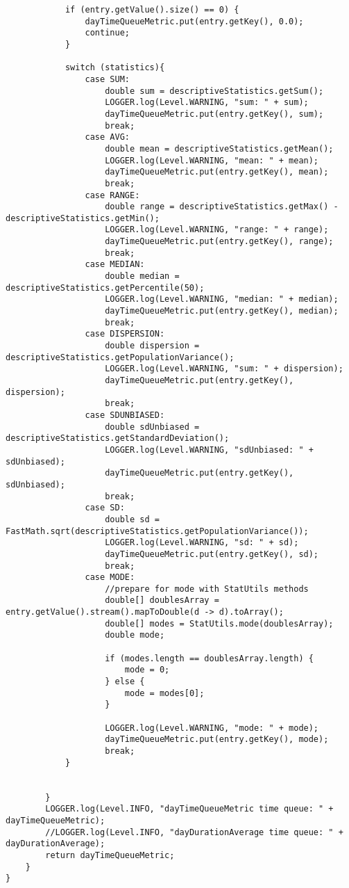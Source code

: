 \begin{lstlisting}
            if (entry.getValue().size() == 0) {
                dayTimeQueueMetric.put(entry.getKey(), 0.0);
                continue;
            }

            switch (statistics){
                case SUM:
                    double sum = descriptiveStatistics.getSum();
                    LOGGER.log(Level.WARNING, "sum: " + sum);
                    dayTimeQueueMetric.put(entry.getKey(), sum);
                    break;
                case AVG:
                    double mean = descriptiveStatistics.getMean();
                    LOGGER.log(Level.WARNING, "mean: " + mean);
                    dayTimeQueueMetric.put(entry.getKey(), mean);
                    break;
                case RANGE:
                    double range = descriptiveStatistics.getMax() - descriptiveStatistics.getMin();
                    LOGGER.log(Level.WARNING, "range: " + range);
                    dayTimeQueueMetric.put(entry.getKey(), range);
                    break;
                case MEDIAN:
                    double median = descriptiveStatistics.getPercentile(50);
                    LOGGER.log(Level.WARNING, "median: " + median);
                    dayTimeQueueMetric.put(entry.getKey(), median);
                    break;
                case DISPERSION:
                    double dispersion = descriptiveStatistics.getPopulationVariance();
                    LOGGER.log(Level.WARNING, "sum: " + dispersion);
                    dayTimeQueueMetric.put(entry.getKey(), dispersion);
                    break;
                case SDUNBIASED:
                    double sdUnbiased = descriptiveStatistics.getStandardDeviation();
                    LOGGER.log(Level.WARNING, "sdUnbiased: " + sdUnbiased);
                    dayTimeQueueMetric.put(entry.getKey(), sdUnbiased);
                    break;
                case SD:
                    double sd = FastMath.sqrt(descriptiveStatistics.getPopulationVariance());
                    LOGGER.log(Level.WARNING, "sd: " + sd);
                    dayTimeQueueMetric.put(entry.getKey(), sd);
                    break;
                case MODE:
                    //prepare for mode with StatUtils methods
                    double[] doublesArray = entry.getValue().stream().mapToDouble(d -> d).toArray();
                    double[] modes = StatUtils.mode(doublesArray);
                    double mode;

                    if (modes.length == doublesArray.length) {
                        mode = 0;
                    } else {
                        mode = modes[0];
                    }

                    LOGGER.log(Level.WARNING, "mode: " + mode);
                    dayTimeQueueMetric.put(entry.getKey(), mode);
                    break;
            }


        }
        LOGGER.log(Level.INFO, "dayTimeQueueMetric time queue: " + dayTimeQueueMetric);
        //LOGGER.log(Level.INFO, "dayDurationAverage time queue: " + dayDurationAverage);
        return dayTimeQueueMetric;
    }
}






\end{lstlisting}

